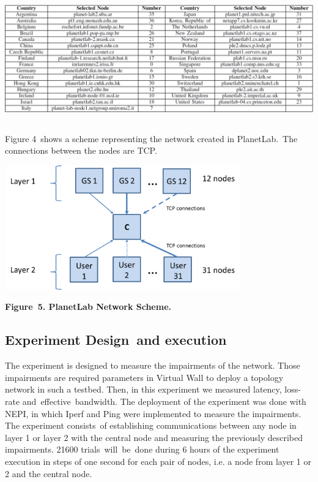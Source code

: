 \documentclass[a4paper]{article}
\begin{document}
{\centering 
\includegraphics[width=6.1375in,height=2.1375in]{ple-img8.png} \par}

Figure 4\ shows a scheme representing the network created in
PlanetLab.\ The connections between the nodes are TCP.

{\centering 
\includegraphics[width=4.01423in,height=2.11349in]{ple-img9.png} \par}

{\centering\bfseries
\label{bkm:Ref387229570}Figure\ 5. PlanetLab Network Scheme.
\par}

\subsection[Experiment Design\ and execution]{Experiment Design\ and
execution}
\hypertarget{Toc387315387}{}The experiment is designed to measure the
impairments of the network. Those impairments are required parameters
in Virtual Wall to deploy a topology network in such a testbed. Then,
in this experiment we measured latency, loss-rate
and\ effective\ bandwidth. The deployment of the experiment was done
with NEPI, in which Iperf and Ping were implemented to measure the
impairments. The experiment consists\ of establishing communications
between any node in layer 1 or layer 2 with the central node and
measuring the previously described impairments. 21600
trials\ will\ be\ done during 6 hours of the experiment execution in
steps of one second for each pair of nodes, i.e. a node from layer 1 or
2 and the central node.
\end{document}
